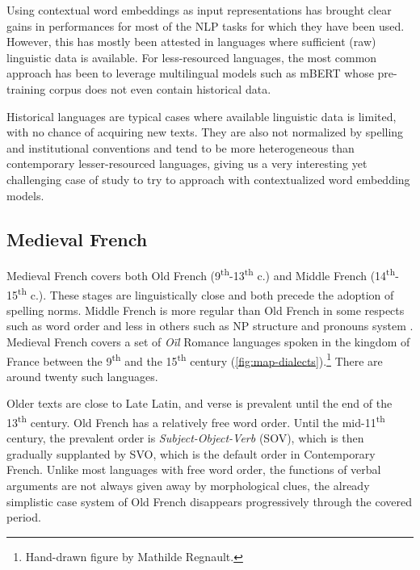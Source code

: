 Using contextual word embeddings as input representations has brought clear gains in performances for most of the NLP tasks for which they have been used. However, this has mostly been attested in languages where sufficient (raw) linguistic data is available. For less-resourced languages, the most common approach has been to leverage multilingual models such as mBERT \citep{devlin-etal-2019-bert} whose pre-training corpus does not even contain historical data.

Historical languages are typical cases where available linguistic data is limited, with no chance of acquiring new texts. They are also not normalized by spelling and institutional conventions and tend to be more heterogeneous than contemporary lesser-resourced languages, giving us a very interesting yet challenging case of study to try to approach with contextualized word embedding models.

\subsection{Medieval French}

Medieval French covers both Old French (9\textsuperscript{th}-13\textsuperscript{th} c.) and Middle French (14\textsuperscript{th}-15\textsuperscript{th} c.). These stages are linguistically close and both precede the adoption of spelling norms. Middle French is more regular than Old French in some respects such as word order \citep{marchello-Nizia-etal-2020-grande} and less in others such as NP structure and pronouns system \citep{marchello-nizia-etal-1979-histoire}. Medieval French covers a set of \textit{Oïl} Romance languages spoken in the kingdom of France between the 9\textsuperscript{th} and the 15\textsuperscript{th} century (\cref{fig:map-dialects}).\footnote{Hand-drawn figure by Mathilde Regnault.} There are around twenty such languages.

Older texts are close to Late Latin, and verse is prevalent until the end of the 13\textsuperscript{th} century. Old French has a relatively free word order. Until the mid-11\textsuperscript{th} century, the prevalent order is \textit{Subject-Object-Verb} (SOV), which is then gradually supplanted by SVO, which is the default order in Contemporary French. Unlike most languages with free word order, the functions of verbal arguments are not always given away by morphological clues, the already simplistic case system of Old French disappears progressively through the covered period.

